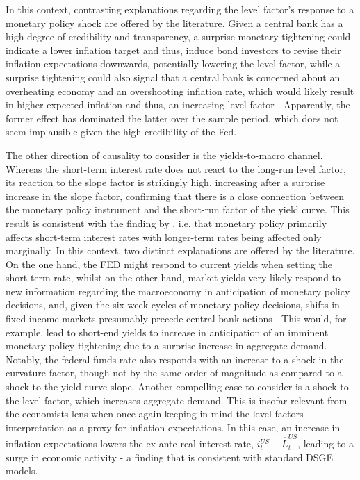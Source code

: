 In this context, contrasting explanations regarding the level factor's response to a monetary policy shock are offered by the literature. 
Given a central bank has a high degree of credibility and transparency, a surprise monetary tightening could indicate a lower inflation target and thus, induce bond investors to revise their inflation expectations downwards, potentially lowering the level factor, while a surprise tightening could also signal that a central bank is concerned about an overheating economy and an overshooting inflation rate, which would likely result in higher expected inflation and thus, an increasing level factor \citep{diebold2006macroeconomy}. 
Apparently, the former effect has dominated the latter over the sample period, which does not seem implausible given the high credibility of the Fed. 

The other direction of causality to consider is the yields-to-macro channel. 
Whereas the short-term interest rate does not react to the long-run level factor, its reaction to the slope factor is strikingly high, increasing after a surprise increase in the slope factor, confirming that there is a close connection between the monetary policy instrument and the short-run factor of the yield curve. 
This result is consistent with the finding by \citet{evans1998monetary}, i.e. that monetary policy primarily affects short-term interest rates with longer-term rates being affected only marginally. 
In this context, two distinct explanations are offered by the literature. 
On the one hand, the FED might respond to current yields when setting the short-term rate, whilst on the other hand, market yields very likely respond to new information regarding the macroeconomy in anticipation of monetary policy decisions, and, given the six week cycles of monetary policy decisions, shifts in fixed-income markets presumably precede central bank actions \citep{diebold2006macroeconomy, morales2010real}.
This would, for example, lead to short-end yields to increase in anticipation of an imminent monetary policy tightening due to a surprise increase in aggregate demand.
Notably, the federal funds rate also responds with an increase to a shock in the curvature factor, though not by the same order of magnitude as compared to a shock to the yield curve slope.  
Another compelling case to consider is a shock to the level factor, which increases aggregate demand. 
This is insofar relevant from the economists lens when once again keeping in mind the level factors interpretation as a proxy for inflation expectations. 
In this case, an increase in inflation expectations lowers the ex-ante real interest rate, $i^{US}_{t} - \hat{L}^{US}_{t}$, leading to a surge in economic activity - a finding that is consistent with standard DSGE models. 
